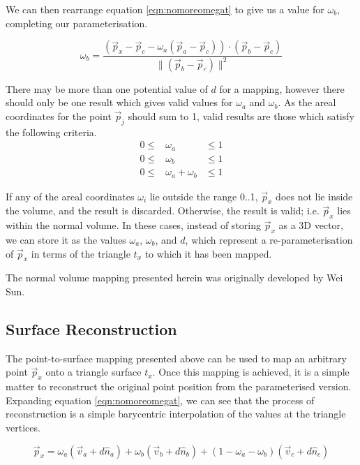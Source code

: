 We can then rearrange equation \ref{eqn:nomoreomegat} to give us a value for $\omega_b$, completing our parameterisation.

\begin{equation} \label{eqn:omega_b}
\omega_b = \frac{(\vec{p}_x - \vec{p}_c - \omega_a(\vec{p}_a - \vec{p}_c)) \cdot (\vec{p}_b-\vec{p}_c)}{\|(\vec{p}_b-\vec{p}_c)\|^2}
\end{equation}

There may be more than one potential value of $d$ for a mapping, however there should only be one result which gives valid values for $\omega_a$ and $\omega_b$. As the areal coordinates for the point $\vec{p}_j$ should sum to 1, valid results are those which satisfy the following criteria.
\begin{eqnarray}
0 \leq & \omega_a & \leq 1 \nonumber \\
0 \leq & \omega_b & \leq 1 \nonumber \\
0 \leq & \omega_a + \omega_b & \leq 1 \nonumber
\end{eqnarray}

If any of the areal coordinates $\omega_i$ lie outside the range 0..1, $\vec{p}_x$ does not lie inside the volume, and the result is discarded. Otherwise, the result is valid; i.e. $\vec{p}_x$ lies within the normal volume. In these cases, instead of storing $\vec{p}_x$ as a 3D vector, we can store it as the values $\omega_a$, $\omega_b$, and $d$, which represent a re-parameterisation of $\vec{p}_x$ in terms of the triangle $t_x$ to which it has been mapped.

The normal volume mapping presented herein was originally developed by Wei Sun.

\subsection{\label{sec:scandata:pointtosurface:reconstruction}Surface Reconstruction}

The point-to-surface mapping presented above can be used to map an arbitrary point $\vec{p}_x$ onto a triangle surface $t_x$. Once this mapping is achieved, it is a simple matter to reconstruct the original point position from the parameterised version. Expanding equation \ref{eqn:nomoreomegat}, we can see that the process of reconstruction is a simple barycentric interpolation of the values at the triangle vertices.

\begin{equation} \label{eqn:linear}
\vec{p}_x = \omega_a(\vec{v}_a + d\hat{n}_a)+ \omega_b(\vec{v}_b + d\hat{n}_b) + (1-\omega_a-\omega_b)(\vec{v}_c + d\hat{n}_c)
\end{equation}

